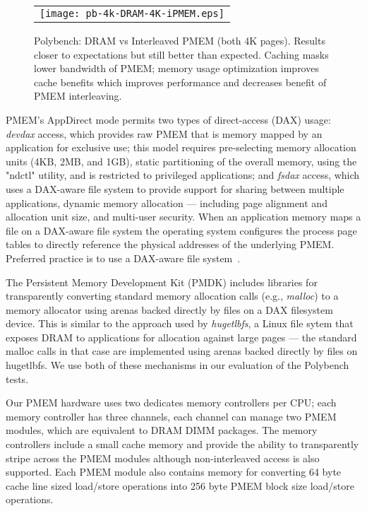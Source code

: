 %
%


\begin{figure}[!th]
  \captionsetup{justification=centering}
  \centering
  \caption{Polybench: DRAM vs Interleaved PMEM (both 4K pages).  Results closer to expectations but still better than expected.  Caching masks lower bandwidth of PMEM; memory usage optimization improves cache benefits which improves performance and decreases benefit of PMEM interleaving.}
  \vspace{2mm}
  \label{fig:polybench:dram-vs-ipmem-4k}
  \begin{tabular}{c}
    \texttt{[image: pb-4k-DRAM-4K-iPMEM.eps]}
  \end{tabular}
\end{figure}


PMEM's AppDirect mode permits two types of direct-access (DAX) usage: \textit{devdax} access, which provides raw PMEM that is memory mapped by an application for exclusive use; this model requires pre-selecting memory allocation units (4KB, 2MB, and 1GB), static partitioning of the overall memory, using the "ndctl" utility, and is restricted to privileged applications; and \textit{fsdax} access, which uses a DAX-aware file system to provide support for sharing between multiple applications, dynamic memory allocation --- including page alignment and allocation unit size, and multi-user security.  When an application memory maps a file on a DAX-aware file system the operating system configures the process page tables to directly reference the physical addresses of the underlying PMEM.  Preferred practice is to use a DAX-aware file system~\cite{rudoff2019NVMProgrammingModel}.


The Persistent Memory Development Kit (PMDK) includes libraries for transparently converting standard memory allocation calls (e.g., \textit{malloc}) to a memory allocator using arenas backed directly by files on a DAX filesystem device.  This is similar to the approach used by \textit{hugetlbfs}, a Linux file sytem that exposes DRAM to applications for allocation against large pages --- the standard malloc calls in that case are implemented using arenas backed directly by files on hugetlbfs.  We use both of these mechanisms in our evaluation of the Polybench tests.

Our PMEM hardware uses two dedicates memory controllers per CPU; each memory controller has three channels, each channel can manage two PMEM modules, which are equivalent to DRAM DIMM packages.   The memory controllers include a small cache memory and provide the ability to transparently stripe across the PMEM modules although non-interleaved access is also supported.  Each PMEM module also contains memory for converting 64 byte cache line sized load/store operations into 256 byte PMEM block size load/store operations.

